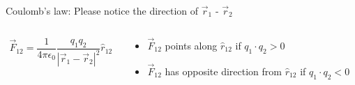 \begin{frame}{Coulomb's law: Please notice the direction of $\vec{r}_1$ - $\vec{r}_2$}
  \begin{columns}
    \begin{column}{0.30\textwidth}
      \begin{equation*}
        \vec{F}_{12} = \frac{1}{4\pi\epsilon_0} \frac{q_1 q_2}{|\vec{r}_{1}-\vec{r}_{2}|^{2}} \hat{r}_{12}
      \end{equation*}
    \end{column}
    \begin{column}{0.70\textwidth}
        \begin{itemize}
          \item $\vec{F}_{12}$ points along $\hat{r}_{12}$ if $q_1 \cdot q_2 > 0$
          \item $\vec{F}_{12}$ has opposite direction from $\hat{r}_{12}$ if $q_1 \cdot q_2 < 0$
        \end{itemize}
    \end{column}
  \end{columns}

\end{frame}

%
%
%

